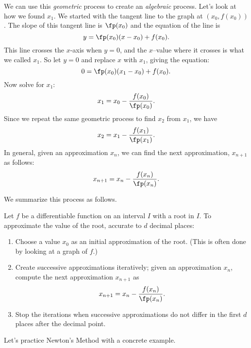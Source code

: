 We can use this \textit{geometric} process to create an \textit{algebraic} process.  Let's look at how we found $x_1$.  We started with the tangent line to the graph at $(x_0,f(x_0))$.  The slope of this tangent line is $\fp(x_0)$ and the equation of the line is
$$y=\fp(x_0)(x-x_0)+f(x_0).$$
This line crosses the $x$-axis when $y=0$, and the $x$--value where it crosses is what we called $x_1$. So let $y=0$ and replace $x$ with $x_1$, giving the equation: 
$$ 0 = \fp(x_0)(x_1-x_0)+f(x_0).$$ 
Now solve for $x_1$:
$$x_1=x_0-\frac{f(x_0)}{\fp(x_0)}.$$
Since we repeat the same geometric process to find $x_2$ from $x_1$, we have
$$x_2=x_1-\frac{f(x_1)}{\fp(x_1)}.$$
In general, given an approximation $x_n$, we can find the next approximation, $x_{n+1}$ as follows:
$$x_{n+1} = x_{n} - \frac{f(x_{n})}{\fp(x_{n})}.$$

We summarize this process as follows.

{Let $f$ be a differentiable function on an interval $I$ with a root in $I$. To approximate the value of the root, accurate to $d$ decimal places:
\begin{enumerate}
	\item		Choose a value $x_0$ as an initial approximation of the root. (This is often done by looking at a graph of $f$.)
	\item		Create successive approximations iteratively; given an approximation $x_n$, compute the next approximation $x_{n+1}$ as $$x_{n+1} = x_n - \frac{f(x_n)}{\fp(x_n)}.$$
	\item		Stop the iterations when successive approximations do not differ in the first $d$ places after the decimal point.
\end{enumerate}}



Let's practice Newton's Method with a concrete example.

